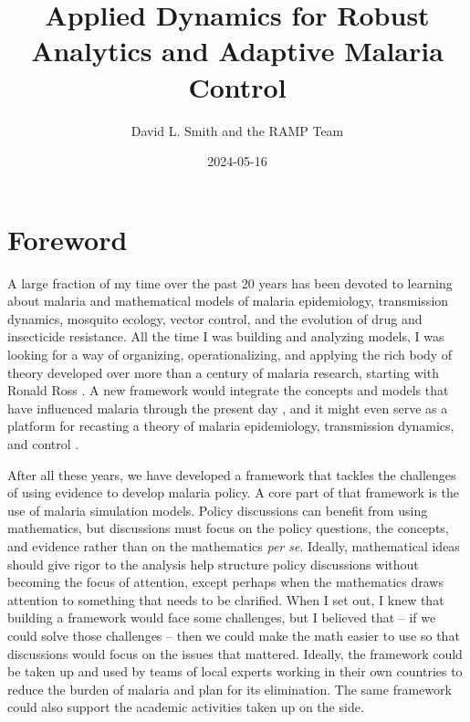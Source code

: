 \documentclass[
]{book}
\title{Applied Dynamics for Robust Analytics and Adaptive Malaria Control}
\author{David L. Smith and the RAMP Team}
\date{2024-05-16}
\begin{document}
\maketitle

{
\setcounter{tocdepth}{2}
\tableofcontents
}
\chapter*{Foreword}\label{foreword}

A large fraction of my time over the past 20 years has been devoted to learning about malaria and mathematical models of malaria epidemiology, transmission dynamics, mosquito ecology, vector control, and the evolution of drug and insecticide resistance.
All the time I was building and analyzing models, I was looking for a way of organizing, operationalizing, and applying the rich body of theory developed over more than a century of malaria research, starting with Ronald Ross \autocite{RossR1911Book,SmithDL2012_RossMacdonald}.
A new framework would integrate the concepts and models that have influenced malaria through the present day \autocite{ReinerRC2013SystematicReview,SmithNR2018AgentbasedModels}, and it might even serve as a platform for recasting a theory of malaria epidemiology, transmission dynamics, and control \autocite{SmithDL2014Recasting}.

After all these years, we have developed a framework that tackles the challenges of using evidence to develop malaria policy. A core part of that framework is the use of malaria simulation models.
Policy discussions can benefit from using mathematics, but discussions must focus on the policy questions, the concepts, and evidence rather than on the mathematics \emph{per se}.
Ideally, mathematical ideas should give rigor to the analysis help structure policy discussions without becoming the focus of attention, except perhaps when the mathematics draws attention to something that needs to be clarified.
When I set out, I knew that building a framework would face some challenges, but I believed that -- if we could solve those challenges -- then we could make the math easier to use so that discussions would focus on the issues that mattered.
Ideally, the framework could be taken up and used by teams of local experts working in their own countries to reduce the burden of malaria and plan for its elimination.
The same framework could also support the academic activities taken up on the side.
\end{document}

